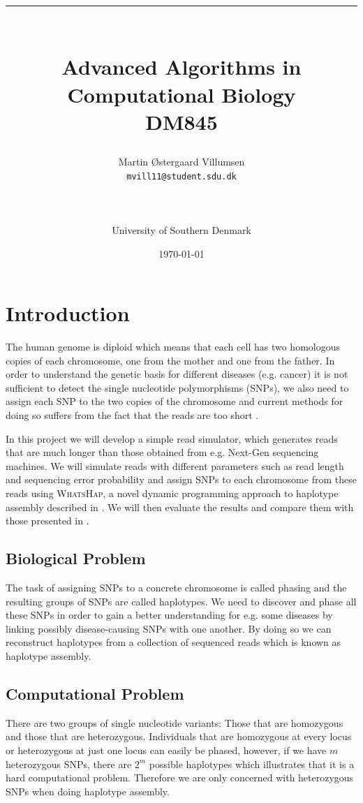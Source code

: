 \documentclass[10pt,a4paper]{article}
\title{\rule{12.5cm}{0.5mm}\\Advanced Algorithms in Computational Biology\\DM845}
\author{Martin Østergaard Villumsen\\\texttt{mvill11@student.sdu.dk}\\\rule{6.5cm}{0.5mm}\\University of Southern Denmark\\}
\date{\today}
\begin{document}
\maketitle
\newpage
\tableofcontents
\newpage
\section{Introduction}
The human genome is diploid which means that each cell has two homologous copies of each chromosome, one from the mother and one from the father. In order to understand the genetic basis for different diseases (e.g. cancer) it is not sufficient to detect the single nucleotide polymorphisms (SNPs), we also need to assign each SNP to the two copies of the chromosome and current methods for doing so suffers from the fact that the reads are too short \cite{whatshap}.

In this project we will develop a simple read simulator, which generates reads that are much longer than those obtained from e.g. Next-Gen sequencing machines. We will simulate reads with different parameters such as read length and sequencing error probability and assign SNPs to each chromosome from these reads using \textsc{WhatsHap}, a novel dynamic programming approach to haplotype assembly described in \cite{whatshap}. We will then evaluate the results and compare them with those presented in \cite{whatshap}.

\subsection{Biological Problem}
The task of assigning SNPs to a concrete chromosome is called phasing and the resulting groups of SNPs are called haplotypes. We need to discover and phase all these SNPs in order to gain a better understanding for e.g. some diseases by linking possibly disease-causing SNPs with one another. By doing so we can reconstruct haplotypes from a collection of sequenced reads which is known as haplotype assembly.

\subsection{Computational Problem}
There are two groups of single nucleotide variants: Those that are homozygous and those that are heterozygous. Individuals that are homozygous at every locus or heterozygous at just one locus can easily be phased, however, if we have $m$ heterozygous SNPs, there are $2^m$ possible haplotypes which illustrates that it is a hard computational problem. Therefore we are only concerned with heterozygous SNPs when doing haplotype assembly. 
\end{document}
